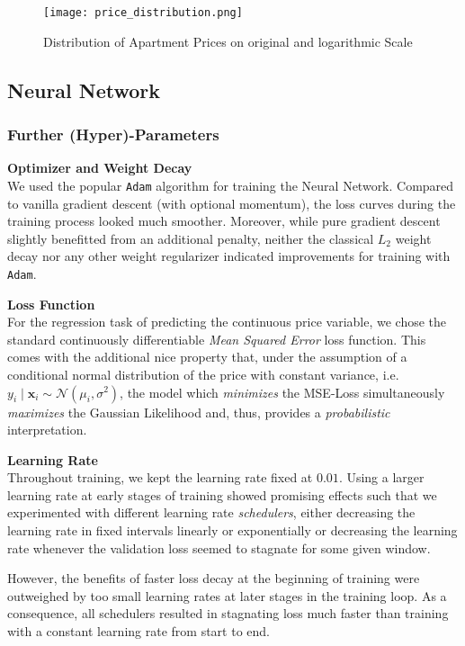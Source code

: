 \begin{figure}[ht]
  \centering
  \texttt{[image: price\_distribution.png]}
  \caption{Distribution of Apartment Prices on original and logarithmic Scale}
  \label{fig:price-distribution}
\end{figure}


\subsection{Neural Network}

\subsubsection{Further (Hyper)-Parameters} \label{appendix:hyperparameters}

\textbf{Optimizer and Weight Decay} \\
We used the popular \texttt{Adam} algorithm \citep{kingma2017} for training the Neural Network.
Compared to vanilla gradient descent (with optional momentum), the loss curves during the training process looked much smoother.
Moreover, while pure gradient descent slightly benefitted from an additional penalty, neither the classical $L_2$ weight decay nor any other weight regularizer indicated improvements for training with \texttt{Adam}.

\textbf{Loss Function} \\
For the regression task of predicting the continuous price variable, we chose the standard continuously differentiable \emph{Mean Squared Error} loss function.
This comes with the additional nice property that, under the assumption of a conditional normal distribution of the price with constant variance, i.e. $y_i \mid \mathbf{x}_i \sim \mathcal{N} \left(\mu_i, \sigma^2 \right)$, the model which \emph{minimizes} the MSE-Loss simultaneously \emph{maximizes} the Gaussian Likelihood and, thus, provides a \emph{probabilistic} interpretation.

\textbf{Learning Rate} \\
Throughout training, we kept the learning rate fixed at $0.01$.
Using a larger learning rate at early stages of training showed promising effects such that we experimented with different learning rate \emph{schedulers}, either decreasing the learning rate in fixed intervals linearly or exponentially or decreasing the learning rate whenever the validation loss seemed to stagnate for some given window.

However, the benefits of faster loss decay at the beginning of training were outweighed by too small learning rates at later stages in the training loop.
As a consequence, all schedulers resulted in stagnating loss much faster than training with a constant learning rate from start to end.

